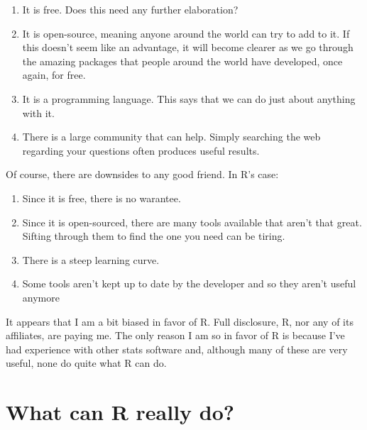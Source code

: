 \documentclass{book}
\begin{document}
\begin{enumerate}
\item It is free. Does this need any further elaboration?
\item It is open-source, meaning anyone around the world can try to add to it. If this doesn't seem like an advantage, it will become clearer as we go through the amazing packages that people around the world have developed, once again, for free.
\item It is a programming language. This says that we can do just about anything with it.
\item There is a large community that can help. Simply searching the web regarding your questions often produces useful results.
\end{enumerate}
Of course, there are downsides to any good friend. In R's case: 
\begin{enumerate}
\item Since it is free, there is no warantee.
\item Since it is open-sourced, there are many tools available that aren't that great. Sifting through them to find the one you need can be tiring.
\item There is a steep learning curve. 
\item Some tools aren't kept up to date by the developer and so they aren't useful anymore 
\end{enumerate}
It appears that I am a bit biased in favor of R. Full disclosure, R, nor any of its affiliates, are paying me. The only reason I am so in favor of R is because I've had experience with other stats software and, although many of these are very useful, none do quite what R can do.

\section*{What can R really do?}
\end{document}
